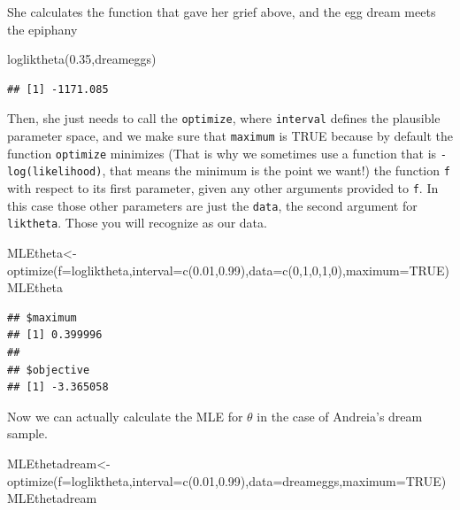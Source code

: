 \documentclass[
]{book}
\newenvironment{Shaded}{\begin{snugshade}}{\end{snugshade}}
\newcommand{\AttributeTok}[1]{\textcolor[rgb]{0.77,0.63,0.00}{#1}}
\newcommand{\ConstantTok}[1]{\textcolor[rgb]{0.00,0.00,0.00}{#1}}
\newcommand{\DecValTok}[1]{\textcolor[rgb]{0.00,0.00,0.81}{#1}}
\newcommand{\FloatTok}[1]{\textcolor[rgb]{0.00,0.00,0.81}{#1}}
\newcommand{\FunctionTok}[1]{\textcolor[rgb]{0.00,0.00,0.00}{#1}}
\newcommand{\NormalTok}[1]{#1}
\newcommand{\OtherTok}[1]{\textcolor[rgb]{0.56,0.35,0.01}{#1}}
\begin{document}
She calculates the function that gave her grief above, and the egg dream meets the epiphany

\begin{Shaded}
\begin{Highlighting}[]
\FunctionTok{logliktheta}\NormalTok{(}\FloatTok{0.35}\NormalTok{,dreameggs)}
\end{Highlighting}
\end{Shaded}

\begin{verbatim}
## [1] -1171.085
\end{verbatim}

Then, she just needs to call the \texttt{optimize}, where \texttt{interval} defines the plausible parameter space, and we make sure that \texttt{maximum} is TRUE because by default the function \texttt{optimize} minimizes (That is why we sometimes use a function that is \texttt{-log(likelihood)}, that means the minimum is the point we want!) the function \texttt{f} with respect to its first parameter, given any other arguments provided to \texttt{f}. In this case those other parameters are just the \texttt{data}, the second argument for \texttt{liktheta}. Those you will recognize as our data.

\begin{Shaded}
\begin{Highlighting}[]
\NormalTok{MLEtheta}\OtherTok{\textless{}{-}}\FunctionTok{optimize}\NormalTok{(}\AttributeTok{f=}\NormalTok{logliktheta,}\AttributeTok{interval=}\FunctionTok{c}\NormalTok{(}\FloatTok{0.01}\NormalTok{,}\FloatTok{0.99}\NormalTok{),}\AttributeTok{data=}\FunctionTok{c}\NormalTok{(}\DecValTok{0}\NormalTok{,}\DecValTok{1}\NormalTok{,}\DecValTok{0}\NormalTok{,}\DecValTok{1}\NormalTok{,}\DecValTok{0}\NormalTok{),}\AttributeTok{maximum=}\ConstantTok{TRUE}\NormalTok{)}
\NormalTok{MLEtheta}
\end{Highlighting}
\end{Shaded}

\begin{verbatim}
## $maximum
## [1] 0.399996
## 
## $objective
## [1] -3.365058
\end{verbatim}

Now we can actually calculate the MLE for \(\theta\) in the case of Andreia's dream sample.

\begin{Shaded}
\begin{Highlighting}[]
\NormalTok{MLEthetadream}\OtherTok{\textless{}{-}}\FunctionTok{optimize}\NormalTok{(}\AttributeTok{f=}\NormalTok{logliktheta,}\AttributeTok{interval=}\FunctionTok{c}\NormalTok{(}\FloatTok{0.01}\NormalTok{,}\FloatTok{0.99}\NormalTok{),}\AttributeTok{data=}\NormalTok{dreameggs,}\AttributeTok{maximum=}\ConstantTok{TRUE}\NormalTok{)}
\NormalTok{MLEthetadream}
\end{Highlighting}
\end{Shaded}
\end{document}
